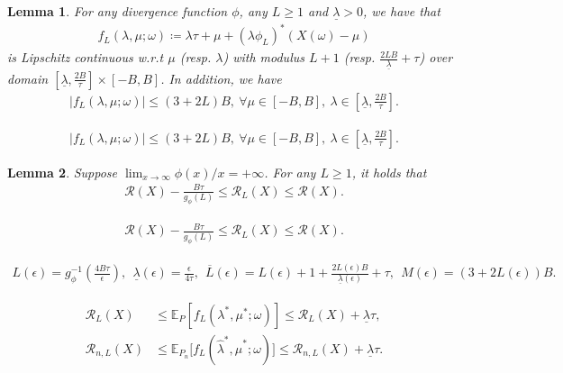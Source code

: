 \documentclass[10pt,a4paper]{amsart}
\newtheorem{lemma}{Lemma}
\newcommand{\EE}{\mathbb{E}}
\newcommand{\abs}[1]{\left\lvert #1 \right\rvert}
\newcommand{\cR}{\mathcal{R}}
\renewcommand{\frac}[2]{\tfrac{#1}{#2}}
\newcommand{\rbr}[1]{\left(#1\right)}
\newcommand{\sbr}[1]{\left[#1\right]}
\begin{document}
\begin{lemma}\label{lemma_lipschitz}
For any divergence function $\phi$, any $L \geq 1$ and $\underline{\lambda} > 0$,
we have that
\begin{align}\label{def_f_truncate}
f_L(\lambda, \mu; \omega) \coloneqq  \lambda \tau + \mu + (\lambda \phi_L)^*(X(\omega) - \mu)
\end{align}
is Lipschitz continuous w.r.t $\mu$ (resp. $\lambda$) with modulus $L+1$ (resp. $\frac{2LB}{\underline{\lambda}} + \tau$) 
over domain 
$ [\underline{\lambda},  \frac{2B}{\tau}] \times [-B, B]$. 
In addition, we have 
\begin{align}\label{dual_stoch_obj_bound}
\abs{f_L(\lambda, \mu; \omega) } \leq (3 + 2L) B , ~ \forall 
\mu  \in [-B, B], ~ \lambda \in [\underline{\lambda},  \frac{2B}{\tau}].
\end{align}
\end{lemma}

\begin{align}
\abs{f_L(\lambda, \mu; \omega) } \leq (3 + 2L) B , ~ \forall 
\mu  \in [-B, B], ~ \lambda \in [\underline{\lambda},  \frac{2B}{\tau}].
\end{align}

\begin{lemma}\label{lemma_risk_via_truncation}
Suppose $\lim_{x \to \infty} \phi(x) / x = +\infty$.
For any $L \geq 1$, it holds that 
\begin{align}\label{ineq_truncate_tail_via_growth}
\cR(X) - \frac{B\tau}{g_\phi(L)} \leq \cR_L(X) \leq \cR(X).
\end{align}
\end{lemma}

\begin{align}
\cR(X) - \frac{B\tau}{g_\phi(L)} \leq \cR_L(X) \leq \cR(X).
\end{align}

 \begin{align}\label{eq_lip_m_constants}
 L(\epsilon)  =  g_\phi^{-1}\rbr{\frac{4 B\tau }{ \epsilon}} , ~~ \underline{\lambda}(\epsilon) =\frac{\epsilon}{4\tau}, ~ ~
 \overline{L} (\epsilon) = {L (\epsilon) +1 +  \frac{2L(\epsilon)B}{\underline{\lambda}(\epsilon)}  + \tau},  ~~ 
 M(\epsilon) = 
  (3 + 2L(\epsilon) ) B  .
 \end{align}

\begin{align}
\cR_L(X)   & \leq   \EE_P \sbr{f_L (\lambda^*, \mu^*; \omega)} \leq   \cR_L(X) + \underline{\lambda} \tau , \label{risk_via_emp_restrict} \\
   \cR_{n,L}(X)  & \leq  \EE_{P_n} \big[{f_L (\hat{\lambda}^*, \hat{\mu}^*; \omega)} \big] \leq \cR_{n,L}(X) +  \underline{\lambda}  \tau . \label{risk_via_emp_restrict_truncate}
\end{align}
\end{document}
